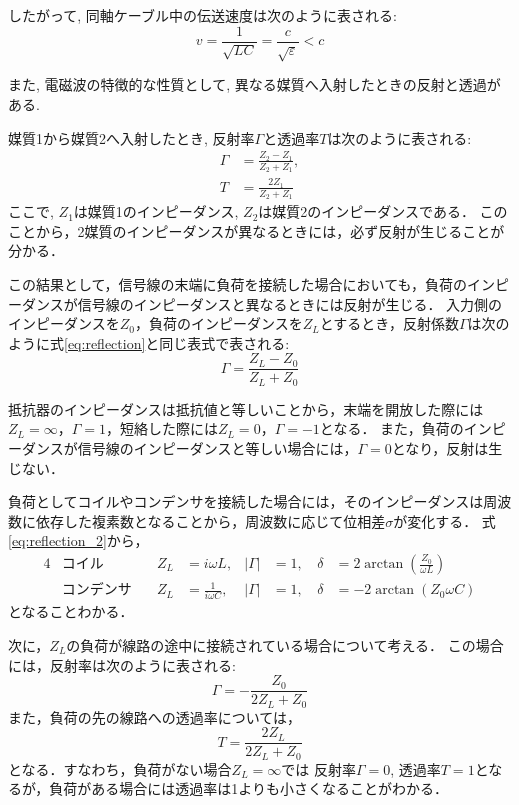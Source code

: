 \documentclass[uplatex,dvipdfmx,a4j,12pt]{jsarticle}
\begin{document}
したがって, 同軸ケーブル中の伝送速度は次のように表される:
\begin{equation}
  v = \frac{1}{\sqrt{LC}} = \frac{c}{\sqrt{\varepsilon}} < c \label{eq:velocity_cable}
\end{equation}

\enskip

また, 電磁波の特徴的な性質として, 異なる媒質へ入射したときの反射と透過がある.

媒質1から媒質2へ入射したとき, 反射率$\Gamma$と透過率$T$は次のように表される:
\begin{align}
  \Gamma &= \frac{Z_2 - Z_1}{Z_2 + Z_1}, \label{eq:reflection}\\
  T &= \frac{2Z_1}{Z_2 + Z_1}
\end{align}
ここで, $Z_1$は媒質1のインピーダンス, $Z_2$は媒質2のインピーダンスである．
このことから，2媒質のインピーダンスが異なるときには，必ず反射が生じることが分かる．

この結果として，信号線の末端に負荷を接続した場合においても，負荷のインピーダンスが信号線のインピーダンスと異なるときには反射が生じる．
入力側のインピーダンスを$Z_0$，負荷のインピーダンスを$Z_L$とするとき，反射係数$\Gamma$は次のように式\eqref{eq:reflection}と同じ表式で表される:
\begin{equation}
  \Gamma = \frac{Z_L - Z_0}{Z_L + Z_0} \label{eq:reflection_2}
\end{equation}

抵抗器のインピーダンスは抵抗値と等しいことから，末端を開放した際には$Z_L = \infty$，$\Gamma = 1$，短絡した際には$Z_L = 0$，$\Gamma = -1$となる．
また，負荷のインピーダンスが信号線のインピーダンスと等しい場合には，$\Gamma = 0$となり，反射は生じない．

負荷としてコイルやコンデンサを接続した場合には，そのインピーダンスは周波数に依存した複素数となることから，周波数に応じて位相差$\sigma$が変化する．
式\eqref{eq:reflection_2}から， 
\begin{alignat}{4}
  &\text{コイル}\quad & Z_L &= i\omega L, & |\Gamma| &= 1, & \delta &= 2\arctan\left(\frac{ Z_0}{ \omega L}\right) \label{eq:coil_phase}\\
  &\text{コンデンサ}\quad & Z_L &= \frac{1}{i\omega C},\, & |\Gamma| &= 1,\, & \delta &= -2\arctan\left({Z_0\omega C}\right) \label{eq:condenser_phase}
\end{alignat}
となることわかる．

次に，$Z_L$の負荷が線路の途中に接続されている場合について考える．
この場合には，反射率は次のように表される:
\begin{equation}
  \Gamma = -\frac{Z_0}{2Z_L + Z_0}
  \label{eq:reflection_3}
\end{equation}
また，負荷の先の線路への透過率については，
\begin{equation}
  T = \frac{2Z_L}{2Z_L + Z_0}
  \label{eq:transmission}
\end{equation}
となる．すなわち，負荷がない場合$Z_L = \infty$では 反射率$\Gamma =  0$, 透過率$T = 1$となるが，負荷がある場合には透過率は1よりも小さくなることがわかる．
\end{document}
